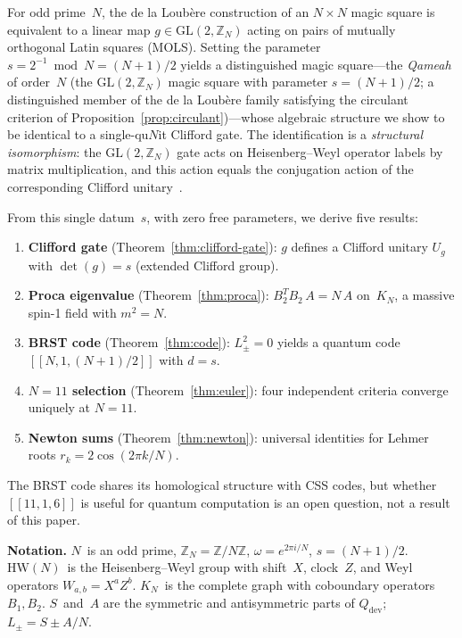 \documentclass[aip,jmp,reprint,superscriptaddress,floatfix,nofootinbib]{revtex4-2}
\theoremstyle{definition}
\theoremstyle{remark}
\newcommand{\ZN}{\mathbb{Z}_N}
\newcommand{\GL}{\mathrm{GL}}
\newcommand{\HW}{\mathrm{HW}}
\begin{document}
For odd prime~$N$, the de la Loub\`{e}re construction of an $N \times N$
magic square is equivalent to a linear map $g \in \GL(2,\ZN)$ acting on
pairs of mutually orthogonal Latin squares (MOLS).  Setting the
parameter $s = 2^{-1} \bmod N = (N{+}1)/2$ yields a
distinguished magic square---the \emph{Qameah} of order~$N$ (the
$\GL(2,\ZN)$ magic square with parameter $s = (N{+}1)/2$; a
distinguished member of the de la Loub\`{e}re family satisfying the
circulant criterion of Proposition~\ref{prop:circulant})---whose
algebraic structure we show to be identical to a single-qu$N$it
Clifford gate.
The identification is a \emph{structural isomorphism}: the
$\GL(2,\ZN)$ gate acts on Heisenberg--Weyl operator labels by matrix
multiplication, and this action equals the conjugation action of the
corresponding Clifford unitary~\cite{Appleby2005, Gross2006}.

From this single datum~$s$, with zero free parameters, we derive five
results:
\begin{enumerate}[label=(\roman*)]
\item \textbf{Clifford gate} (Theorem~\ref{thm:clifford-gate}):
  $g$ defines a Clifford unitary $U_g$ with $\det(g) = s$
  (extended Clifford group).
\item \textbf{Proca eigenvalue} (Theorem~\ref{thm:proca}):
  $B_2^T B_2\, A = N\, A$ on~$K_N$, a massive spin-1 field with
  $m^2 = N$.
\item \textbf{BRST code} (Theorem~\ref{thm:code}):
  $L_\pm^2 = 0$ yields a quantum code $[[N, 1, (N{+}1)/2]]$
  with $d = s$.
\item \textbf{$N = 11$ selection} (Theorem~\ref{thm:euler}):
  four independent criteria converge uniquely at $N = 11$.
\item \textbf{Newton sums} (Theorem~\ref{thm:newton}):
  universal identities for Lehmer roots $r_k = 2\cos(2\pi k/N)$.
\end{enumerate}
The BRST code shares its homological structure with CSS codes, but
whether $[[11, 1, 6]]$ is useful for quantum computation is an open
question, not a result of this paper.

\medskip
\noindent\textbf{Notation.}
$N$~is an odd prime, $\ZN = \mathbb{Z}/N\mathbb{Z}$,
$\omega = e^{2\pi i/N}$, $s = (N{+}1)/2$.  $\HW(N)$~is the
Heisenberg--Weyl group with shift~$X$, clock~$Z$, and Weyl
operators $W_{a,b} = X^a Z^b$.  $K_N$~is the complete graph with
coboundary operators $B_1, B_2$.  $S$~and~$A$ are the symmetric
and antisymmetric parts of $Q_{\mathrm{dev}}$;
$L_\pm = S \pm A/N$.
\end{document}
